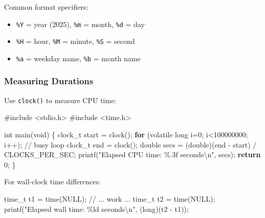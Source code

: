 \documentclass[
  letterpaper,
  DIV=11,
  numbers=noendperiod]{scrreprt}
\newenvironment{Shaded}{\begin{snugshade}}{\end{snugshade}}
\newcommand{\CommentTok}[1]{\textcolor[rgb]{0.37,0.37,0.37}{#1}}
\newcommand{\ControlFlowTok}[1]{\textcolor[rgb]{0.00,0.23,0.31}{\textbf{#1}}}
\newcommand{\DataTypeTok}[1]{\textcolor[rgb]{0.68,0.00,0.00}{#1}}
\newcommand{\DecValTok}[1]{\textcolor[rgb]{0.68,0.00,0.00}{#1}}
\newcommand{\ImportTok}[1]{\textcolor[rgb]{0.00,0.46,0.62}{#1}}
\newcommand{\NormalTok}[1]{\textcolor[rgb]{0.00,0.23,0.31}{#1}}
\newcommand{\OperatorTok}[1]{\textcolor[rgb]{0.37,0.37,0.37}{#1}}
\newcommand{\PreprocessorTok}[1]{\textcolor[rgb]{0.68,0.00,0.00}{#1}}
\newcommand{\SpecialCharTok}[1]{\textcolor[rgb]{0.37,0.37,0.37}{#1}}
\newcommand{\StringTok}[1]{\textcolor[rgb]{0.13,0.47,0.30}{#1}}
\providecommand{\tightlist}{%
  \setlength{\itemsep}{0pt}\setlength{\parskip}{0pt}}
\begin{document}
Common format specifiers:

\begin{itemize}
\tightlist
\item
  \texttt{\%Y} = year (2025), \texttt{\%m} = month, \texttt{\%d} = day
\item
  \texttt{\%H} = hour, \texttt{\%M} = minute, \texttt{\%S} = second
\item
  \texttt{\%a} = weekday name, \texttt{\%b} = month name
\end{itemize}

\subsubsection{Measuring Durations}\label{measuring-durations}

Use \texttt{clock()} to measure CPU time:

\begin{Shaded}
\begin{Highlighting}[]
\PreprocessorTok{\#include }\ImportTok{\textless{}stdio.h\textgreater{}}
\PreprocessorTok{\#include }\ImportTok{\textless{}time.h\textgreater{}}

\DataTypeTok{int}\NormalTok{ main}\OperatorTok{(}\DataTypeTok{void}\OperatorTok{)} \OperatorTok{\{}
\NormalTok{    clock\_t start }\OperatorTok{=}\NormalTok{ clock}\OperatorTok{();}
    \ControlFlowTok{for} \OperatorTok{(}\DataTypeTok{volatile} \DataTypeTok{long}\NormalTok{ i}\OperatorTok{=}\DecValTok{0}\OperatorTok{;}\NormalTok{ i}\OperatorTok{\textless{}}\DecValTok{100000000}\OperatorTok{;}\NormalTok{ i}\OperatorTok{++);} \CommentTok{// busy loop}
\NormalTok{    clock\_t end }\OperatorTok{=}\NormalTok{ clock}\OperatorTok{();}
    \DataTypeTok{double}\NormalTok{ secs }\OperatorTok{=} \OperatorTok{(}\DataTypeTok{double}\OperatorTok{)(}\NormalTok{end }\OperatorTok{{-}}\NormalTok{ start}\OperatorTok{)} \OperatorTok{/}\NormalTok{ CLOCKS\_PER\_SEC}\OperatorTok{;}
\NormalTok{    printf}\OperatorTok{(}\StringTok{"Elapsed CPU time: }\SpecialCharTok{\%.3f}\StringTok{ seconds}\SpecialCharTok{\textbackslash{}n}\StringTok{"}\OperatorTok{,}\NormalTok{ secs}\OperatorTok{);}
    \ControlFlowTok{return} \DecValTok{0}\OperatorTok{;}
\OperatorTok{\}}
\end{Highlighting}
\end{Shaded}

For wall-clock time differences:

\begin{Shaded}
\begin{Highlighting}[]
\DataTypeTok{time\_t}\NormalTok{ t1 }\OperatorTok{=}\NormalTok{ time}\OperatorTok{(}\NormalTok{NULL}\OperatorTok{);}
\CommentTok{// ... work ...}
\DataTypeTok{time\_t}\NormalTok{ t2 }\OperatorTok{=}\NormalTok{ time}\OperatorTok{(}\NormalTok{NULL}\OperatorTok{);}
\NormalTok{printf}\OperatorTok{(}\StringTok{"Elapsed wall time: }\SpecialCharTok{\%ld}\StringTok{ seconds}\SpecialCharTok{\textbackslash{}n}\StringTok{"}\OperatorTok{,} \OperatorTok{(}\DataTypeTok{long}\OperatorTok{)(}\NormalTok{t2 }\OperatorTok{{-}}\NormalTok{ t1}\OperatorTok{));}
\end{Highlighting}
\end{Shaded}
\end{document}
